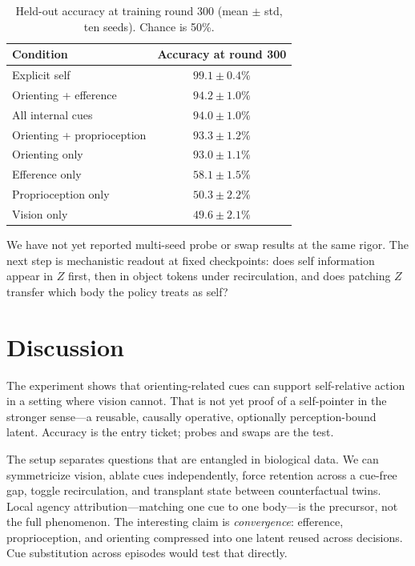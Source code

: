 \documentclass[11pt]{article}
\begin{document}
\begin{table}[t]
\centering
\caption{Held-out accuracy at training round 300 (mean $\pm$ std, ten seeds). Chance is 50\%.}
\label{tab:pilot}
\begin{tabular}{lc}
\toprule
Condition & Accuracy at round 300 \\
\midrule
Explicit self & $99.1 \pm 0.4$\% \\
Orienting + efference & $94.2 \pm 1.0$\% \\
All internal cues & $94.0 \pm 1.0$\% \\
Orienting + proprioception & $93.3 \pm 1.2$\% \\
Orienting only & $93.0 \pm 1.1$\% \\
Efference only & $58.1 \pm 1.5$\% \\
Proprioception only & $50.3 \pm 2.2$\% \\
Vision only & $49.6 \pm 2.1$\% \\
\bottomrule
\end{tabular}
\end{table}

We have not yet reported multi-seed probe or swap results at the same rigor. The next step is mechanistic readout at fixed checkpoints: does self information appear in $Z$ first, then in object tokens under recirculation, and does patching $Z$ transfer which body the policy treats as self?

\section{Discussion}

The experiment shows that orienting-related cues can support self-relative action in a setting where vision cannot. That is not yet proof of a self-pointer in the stronger sense---a reusable, causally operative, optionally perception-bound latent. Accuracy is the entry ticket; probes and swaps are the test.

The setup separates questions that are entangled in biological data. We can symmetricize vision, ablate cues independently, force retention across a cue-free gap, toggle recirculation, and transplant state between counterfactual twins. Local agency attribution---matching one cue to one body---is the precursor, not the full phenomenon. The interesting claim is \emph{convergence}: efference, proprioception, and orienting compressed into one latent reused across decisions. Cue substitution across episodes would test that directly.
\end{document}
